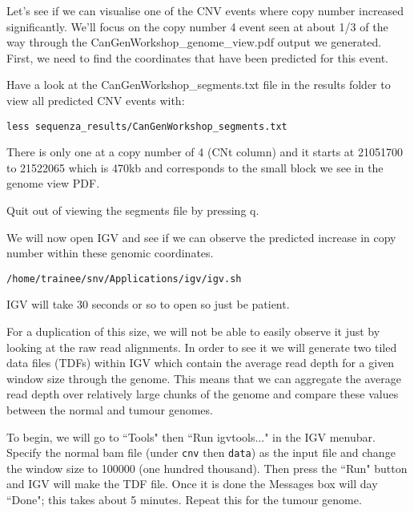 Let's see if we can visualise one of the CNV events where copy number increased significantly. We'll focus on the copy number 4 event seen at about 1/3 of the way through the CanGenWorkshop\_genome\_view.pdf output we generated. First, we need to find the coordinates that have been predicted for this event.\\

\begin{steps}
Have a look at the CanGenWorkshop\_segments.txt file in the results folder to view all predicted CNV events with:
\begin{lstlisting}
less sequenza_results/CanGenWorkshop_segments.txt
\end{lstlisting}
\end{steps}

There is only one at a copy number of 4 (CNt column) and it starts at 21051700 to 21522065 which is 470kb and corresponds to the small block we see in the genome view PDF.

Quit out of viewing the segments file by pressing q.\\

\begin{steps}
We will now open IGV and see if we can observe the predicted increase in copy number within these genomic coordinates.
\begin{lstlisting}
/home/trainee/snv/Applications/igv/igv.sh
\end{lstlisting}
\end{steps}

IGV will take 30 seconds or so to open so just be patient.

For a duplication of this size, we will not be able to easily observe it just by looking at the raw read alignments. In order to see it we will generate two tiled data files (TDFs) within IGV which contain the average read depth for a given window size through the genome. This means that we can aggregate the average read depth over relatively large chunks of the genome and compare these values between the normal and tumour genomes.

To begin, we will go to ``Tools" then ``Run igvtools..." in the IGV menubar. Specify the normal bam file (under \texttt{cnv} then \texttt{data}) as the input file and change the window size to 100000 (one hundred thousand). Then press the ``Run" button and IGV will make the TDF file. Once it is done the Messages box will day ``Done"; this takes about 5 minutes. Repeat this for the tumour genome.

